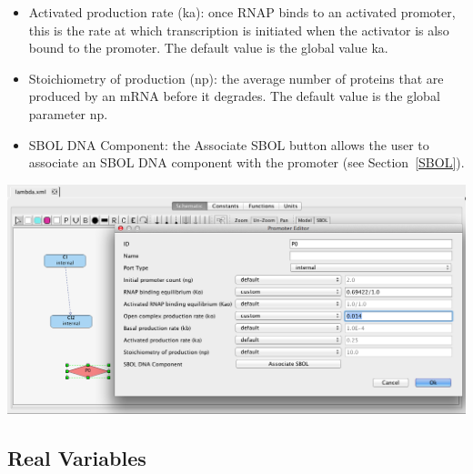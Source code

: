 \documentclass[titlepage,11pt]{article}
\begin{document}
\begin{itemize}
\item Activated production rate (ka): once RNAP binds to an activated promoter, this is the rate at which transcription is initiated when the activator is also bound to the promoter.  The default value is the global value ka.
\item Stoichiometry of production (np): the average number of proteins that are produced by an mRNA before it degrades.  The default value is the global parameter np.
\item SBOL DNA Component: the Associate SBOL button allows the user to associate an SBOL DNA component with the promoter (see Section~\ref{SBOL}).
\end{itemize}

\begin{center}
\includegraphics[width=160mm]{screenshots/promoter}
\end{center}

\clearpage

\subsection{\label{Variables}Real Variables}
\end{document}
